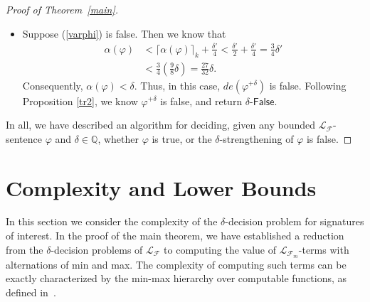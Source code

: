 \documentclass[prodmode]{acmsmall} %
\begin{document}
\begin{proof}[Proof of Theorem~\ref{main}]
\begin{itemize}
\item Suppose (\ref{varphi}) is false. Then we know that 
\begin{align*}
\alpha(\varphi)&<\lceil\alpha(\varphi)\rceil_k + \frac{\delta'}{4}< \frac{\delta'}{2} +\frac{\delta'}{4} = \frac{3}{4}\delta'\\
&<\frac{3}{4}(\frac{9}{8}\delta) = \frac{27}{32}\delta.
\end{align*}
Consequently, $\alpha(\varphi)<\delta$. Thus, in this case, $\mathit{de}(\varphi^{+\delta})$ is false. Following Proposition \ref{tr2}, we know $\varphi^{+\delta}$ is false, and return $\delta$-$\mathsf{False}$.
\end{itemize}
In all, we have described an algorithm for deciding, given any bounded $\mathcal{L}_{\mathcal{F}}$-sentence $\varphi$ and $\delta\in \mathbb{Q}$, whether $\varphi$ is true, or the $\delta$-strengthening of $\varphi$ is false.
\end{proof}



\section{Complexity and Lower Bounds}\label{complexity}

In this section we consider the complexity of the $\delta$-decision problem for signatures of interest. In the proof of the main theorem, we have established a reduction from the $\delta$-decision problems of $\mathcal{L}_{\mathcal{F}}$ to computing the value of $\mathcal{L}_{\mathcal{F}_m}$-terms with alternations of min and max. The complexity of computing such terms can be exactly characterized by the min-max hierarchy over computable functions, as defined in~\cite{Kobook}. 
\end{document}
